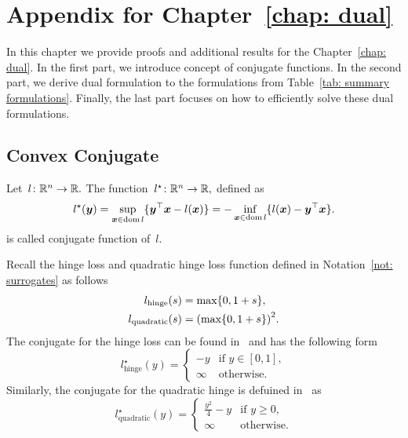 \chapter{Appendix for Chapter~\ref{chap: dual}}\label{app: dual}

In this chapter we provide proofs and additional results for the Chapter~\ref{chap: dual}. In the first part, we introduce concept of conjugate functions. In the second part, we derive dual formulation to the formulations from Table~\ref{tab: summary formulations}. Finally, the last part focuses on how to efficiently solve these dual formulations.

\section{Convex Conjugate}
\begin{definition}\label{def: conjugate}
  Let~$l \colon \mathbb{R}^n \to \mathbb{R}.$ The function~$l^{\star} \colon \mathbb{R}^n \to \mathbb{R},$ defined as
  \begin{equation*}
    l^{\star} (\bm{y})
      =  \sup_{\bm{x} \in \operatorname*{dom} l} \{\bm{y}^{\top}\bm{x} - l(\bm{x})\}
      = -\inf_{\bm{x} \in \operatorname*{dom} l} \{l(\bm{x}) - \bm{y}^{\top}\bm{x}\}.
  \end{equation*}
  is called conjugate function of~$l.$
\end{definition}
Recall the hinge loss and quadratic hinge loss function defined in Notation~\ref{not: surrogates} as follows
\begin{equation*}
  \begin{aligned}
    l_{\text{hinge}}(s) & = \max\Brac[c]{0, 1 + s}, \\
    l_{\text{quadratic}}(s) & = \Brac{\max\Brac[c]{0, 1 + s}}^2.\\
  \end{aligned}
\end{equation*}
The conjugate for the hinge loss can be found in~\cite{shnlev2014accelerated} and has the following form
\begin{equation}\label{eq: conjugate hinge}
  l_{\text{hinge}}^{\star}(y) =
  \begin{cases}
    -y & \text{if } y \in [0, 1], \\
    \infty & \text{otherwise.}
  \end{cases}  
\end{equation}
Similarly, the conjugate for the quadratic hinge is defuined in~\cite{kanamori2013conjugate} as
\begin{equation}\label{eq: conjugate quadratic hinge}
  l_{\text{quadratic}}^{\star}(y) =
  \begin{cases}
    \frac{y^2}{4} - y & \text{if } y \geq 0, \\
    \infty & \text{otherwise.}
  \end{cases}
\end{equation}

